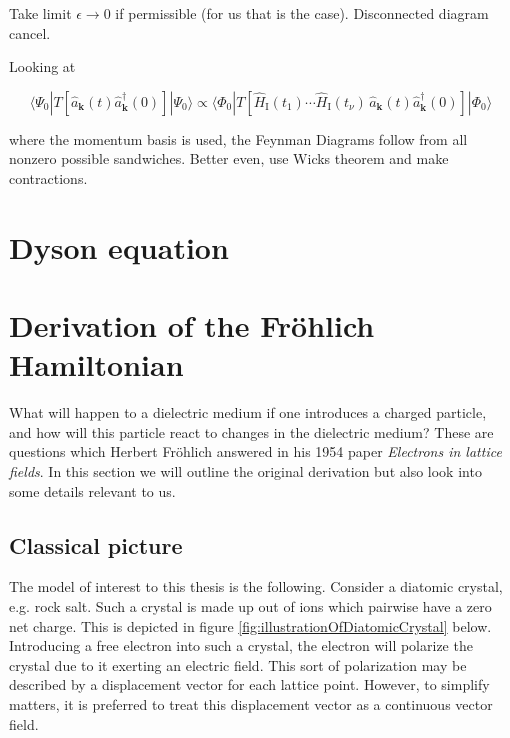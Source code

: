 \documentclass[12pt]{report}
\renewcommand{\vec}[1]{\boldsymbol{\mathbf{#1}}}                        %
\begin{document}
Take limit $ \epsilon \rightarrow 0 $ if permissible (for us that is the case). Disconnected diagram cancel.

Looking at

\begin{equation}
	\langle \Psi_0 |  T[\hat a_{\vec k}(t) \hat a^\dagger_{\vec k}(0)]  | \Psi_0 \rangle
	\propto
	\langle \Phi_0  | T[\hat H_\text{I} (t_1) \cdots \hat H_\text{I} (t_\nu) \, \hat a_{\vec k}(t) \hat a^\dagger_{\vec k}(0)] | \Phi_0 \rangle
\end{equation}

where the momentum basis is used, the Feynman Diagrams follow from all nonzero possible sandwiches. Better even, use Wicks theorem and make contractions.


\section{Dyson equation}


\section{Derivation of the Fröhlich Hamiltonian}


What will happen to a dielectric medium if one introduces a charged particle, and how will this particle react to changes in the dielectric medium? These are questions which Herbert Fröhlich answered in his 1954 paper \textit{Electrons in lattice fields}\cite{electronsInLatticeFields}. In this section we will outline the original derivation but also look into some details relevant to us.

\subsection{Classical picture}

The model of interest to this thesis is the following. Consider a diatomic crystal, e.g. rock salt. Such a crystal is made up out of ions which pairwise have a zero net charge. This is depicted in figure \ref{fig:illustrationOfDiatomicCrystal} below. Introducing a free electron into such a crystal, the electron will polarize the crystal due to it exerting an electric field. This sort of polarization may be described by a displacement vector for each lattice point. However, to simplify matters, it is preferred to treat this displacement vector as a continuous vector field.
\end{document}
